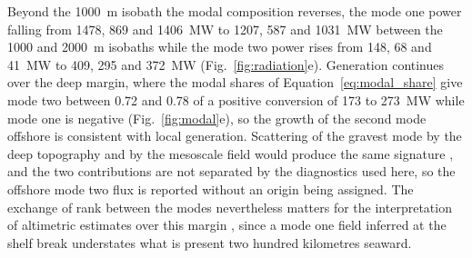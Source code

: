 \documentclass[a4paper,fleqn]{cas-sc}
\begin{document}
Beyond the 1000~m isobath the modal composition reverses, the mode one power falling from 1478, 869 and 1406~MW to 1207, 587 and 1031~MW between the 1000 and 2000~m isobaths while the mode two power rises from 148, 68 and 41~MW to 409, 295 and 372~MW (Fig.~\ref{fig:radiation}e). Generation continues over the deep margin, where the modal shares of Equation~\ref{eq:modal_share} give mode two between 0.72 and 0.78 of a positive conversion of 173 to 273~MW while mode one is negative (Fig.~\ref{fig:modal}e), so the growth of the second mode offshore is consistent with local generation. Scattering of the gravest mode by the deep topography and by the mesoscale field would produce the same signature \citep{kelly:2016,dunphy:2017,nelson:2019,lahaye:2026}, and the two contributions are not separated by the diagnostics used here, so the offshore mode two flux is reported without an origin being assigned. The exchange of rank between the modes nevertheless matters for the interpretation of altimetric estimates over this margin \citep{tchilibou:2022,bendinger_2023,kouogang:2025}, since a mode one field inferred at the shelf break understates what is present two hundred kilometres seaward.
\end{document}
